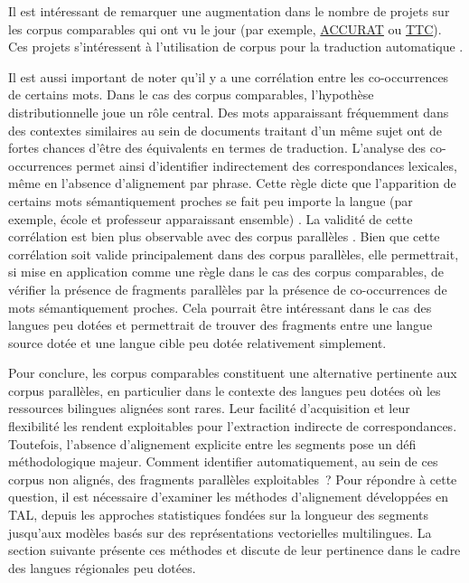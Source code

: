 Il est intéressant de remarquer une augmentation dans le nombre de projets sur les corpus
comparables qui ont vu le jour (par exemple, \href{http://www.accurat-project.eu/}{ACCURAT} ou
\href{https://www.ttc-project.eu/concept-and-objectives/}{TTC}). Ces projets s'intéressent à
l'utilisation de corpus pour la traduction automatique \citep{sharoff_2016}.

Il est aussi important de noter qu'il y a une corrélation entre les co-occurrences de certains mots.
Dans le cas des corpus comparables, l’hypothèse distributionnelle joue un rôle central.
Des mots apparaissant fréquemment dans des contextes similaires au sein de documents traitant
d’un même sujet ont de fortes chances d’être des équivalents en termes de traduction.
L’analyse des co-occurrences permet ainsi d’identifier indirectement des correspondances
lexicales, même en l’absence d’alignement par phrase.
Cette règle dicte que l'apparition de certains mots sémantiquement proches se fait peu importe la langue
(par exemple, école et professeur apparaissant ensemble) \citep{rapp_1995}.
La validité de cette corrélation est bien plus observable avec des corpus parallèles \citep{sharoff_2013a}.
Bien que cette corrélation soit valide principalement dans des corpus parallèles, elle permettrait, si mise en application
comme une règle dans le cas des corpus comparables,
de vérifier la présence de fragments parallèles par la présence de co-occurrences de mots sémantiquement proches.
Cela pourrait être intéressant dans le cas des langues peu dotées et permettrait de trouver des fragments
entre une langue source dotée et une langue cible peu dotée relativement simplement.

\vspace{5mm}

Pour conclure, les corpus comparables constituent une alternative pertinente aux corpus
parallèles, en particulier dans le contexte des langues peu dotées où les ressources bilingues
alignées sont rares. Leur facilité d’acquisition et leur flexibilité les rendent
exploitables pour l’extraction indirecte de correspondances.
Toutefois, l’absence d’alignement explicite entre les segments pose un défi méthodologique
majeur. Comment identifier automatiquement, au sein de ces corpus non alignés, des fragments
parallèles exploitables~?
Pour répondre à cette question, il est nécessaire d’examiner les méthodes d’alignement
développées en TAL, depuis les approches statistiques fondées
sur la longueur des segments jusqu’aux modèles basés sur des représentations
vectorielles multilingues. La section suivante présente ces méthodes et discute de leur pertinence
dans le cadre des langues régionales peu dotées.
